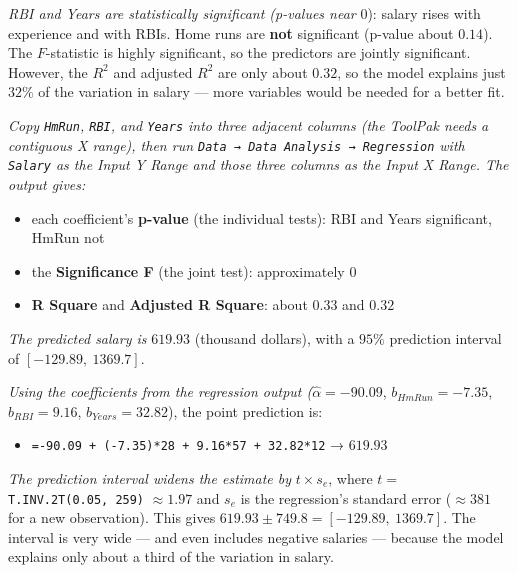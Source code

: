 \documentclass[
  11pt,
  letterpaper,
  DIV=11,
  numbers=noendperiod,
  oneside,
  open=any]{scrreprt}
\providecommand{\tightlist}{%
  \setlength{\itemsep}{0pt}\setlength{\parskip}{0pt}}\usepackage{longtable,booktabs,array}
\newenvironment{bsanswerkey}[2]{%
  \begin{tcolorbox}[bsbase, colback=bspaper2, colframe=bsline, fontupper=\small,
    title={\hypertarget{a-#1}{}\label{a-#1}\hyperlink{q-#1}{\textcolor{bsink2}{\MakeUppercase{#2}}}\hfill
      \hyperlink{q-#1}{\textcolor{bsaccent}{\normalfont\footnotesize back to page \pageref{q-#1}}}}]}%
  {\end{tcolorbox}}
\begin{document}
\begin{bsanswerkey}{bsans135}{Exercise 4, question 1}

\emph{RBI and Years are statistically significant (p-values near}
\(0\)): salary rises with experience and with RBIs. Home runs are
\textbf{not} significant (p-value about \(0.14\)). The \(F\)-statistic
is highly significant, so the predictors are jointly significant.
However, the \(R^2\) and adjusted \(R^2\) are only about \(0.32\), so
the model explains just \(32\%\) of the variation in salary --- more
variables would be needed for a better fit.

\emph{Copy \texttt{HmRun}, \texttt{RBI}, and \texttt{Years} into three
adjacent columns (the ToolPak needs a contiguous X range), then run
\texttt{Data\ →\ Data\ Analysis\ →\ Regression} with \texttt{Salary} as
the Input Y Range and those three columns as the Input X Range. The
output gives:}

\begin{itemize}
\tightlist
\item
  each coefficient's \textbf{p-value} (the individual tests): RBI and
  Years significant, HmRun not
\item
  the \textbf{Significance F} (the joint test): approximately \(0\)
\item
  \textbf{R Square} and \textbf{Adjusted R Square}: about \(0.33\) and
  \(0.32\)
\end{itemize}

\end{bsanswerkey}

\begin{bsanswerkey}{bsans136}{Exercise 4, question 2}

\emph{The predicted salary is} \(619.93\) (thousand dollars), with a
\(95\%\) prediction interval of \([-129.89,\ 1369.7]\).

\emph{Using the coefficients from the regression output
(}\(\hat{\alpha}=-90.09\), \(b_{HmRun}=-7.35\), \(b_{RBI}=9.16\),
\(b_{Years}=32.82\)), the point prediction is:

\begin{itemize}
\tightlist
\item
  \texttt{=-90.09\ +\ (-7.35)*28\ +\ 9.16*57\ +\ 32.82*12} → \(619.93\)
\end{itemize}

\emph{The prediction interval widens the estimate by} \(t \times s_e\),
where \(t =\) \texttt{T.INV.2T(0.05,\ 259)} \(\approx 1.97\) and \(s_e\)
is the regression's standard error (\(\approx 381\) for a new
observation). This gives \(619.93 \pm 749.8 = [-129.89,\ 1369.7]\). The
interval is very wide --- and even includes negative salaries ---
because the model explains only about a third of the variation in
salary.

\end{bsanswerkey}
\end{document}
